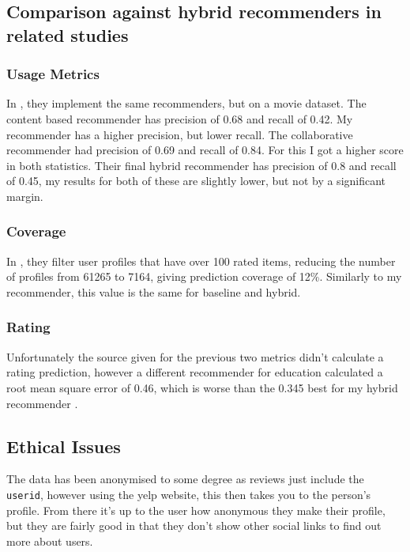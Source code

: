 \documentclass[conference]{IEEEtran}
\begin{document}
\subsection{Comparison against hybrid recommenders in related studies}

\subsubsection{Usage Metrics}

In \cite{evaluation}, they implement the same recommenders, but on a movie dataset. The content based recommender has precision of 0.68 and recall of 0.42. My recommender has a higher precision, but lower recall. The collaborative recommender had precision of 0.69 and recall of 0.84. For this I got a higher score in both statistics. Their final hybrid recommender has precision of 0.8 and recall of 0.45, my results for both of these are slightly lower, but not by a significant margin.

\subsubsection{Coverage}

In \cite{evaluation}, they filter user profiles that have over 100 rated items, reducing the number of profiles from 61265 to 7164, giving prediction coverage of 12\%. Similarly to my recommender, this value is the same for baseline and hybrid.

\subsubsection{Rating}

Unfortunately the source given for the previous two metrics didn't calculate a rating prediction, however a different recommender for education calculated a root mean square error of 0.46, which is worse than the 0.345 best for my hybrid recommender \cite{dwivedi2017recommender}.

\subsection{Ethical Issues}

The data has been anonymised to some degree as reviews just include the \texttt{userid}, however using the yelp website, this then takes you to the person's profile. From there it's up to the user how anonymous they make their profile, but they are fairly good in that they don't show other social links to find out more about users.
\end{document}
